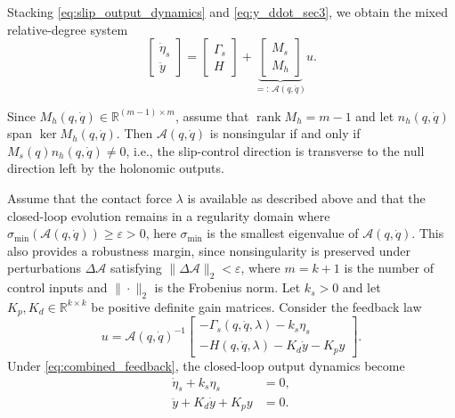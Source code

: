 \documentclass[letterpaper, 10 pt, conference]{ieeeconf}
\begin{document}
{Stacking \eqref{eq:slip_output_dynamics} and \eqref{eq:y_ddot_sec3}, we obtain the mixed relative-degree system
\begin{equation}
\begin{bmatrix}
\dot\eta_s\\[1mm]
\ddot y
\end{bmatrix}
=
\begin{bmatrix}
\Gamma_s\\[1mm]
H
\end{bmatrix}
+
\underbrace{\begin{bmatrix}
M_s\\[1mm]
M_h
\end{bmatrix}}_{=: \,\mathcal A(q,\dot q)}
u.
\label{eq:stacked_output_dynamics}
\end{equation}

Since $M_h(q,\dot q)\in\mathbb{R}^{(m-1)\times m}$, assume that $\operatorname{rank}M_h=m-1$ and let $n_h(q,\dot q)$ span $\ker M_h(q,\dot q)$. Then $\mathcal A(q,\dot q)$ is nonsingular if and only if $M_s(q)n_h(q,\dot q)\neq 0$, i.e., the slip-control direction is transverse to the null direction left by the holonomic outputs.

Assume that the contact force $\lambda$ is available as described above and that the closed-loop evolution remains in a regularity domain where $\sigma_{\min}(\mathcal A(q,\dot q))\geq\varepsilon>0$, here $\sigma_{\min}$ is the smallest eigenvalue of $\mathcal A(q,\dot q)$. This also provides a robustness margin, since nonsingularity is preserved under perturbations $\Delta\mathcal A$ satisfying $\|\Delta\mathcal A\|_2<\varepsilon$, where $m=k+1$ is the number of control inputs and $\|\cdot\|_{2}$ is the Frobenius norm. Let $k_s>0$ and let $K_p,K_d\in\mathbb{R}^{k\times k}$ be positive definite gain matrices. Consider the feedback law
\begin{equation}
u=
\mathcal A(q,\dot q)^{-1}
\begin{bmatrix}
-\Gamma_s(q,\dot q,\lambda)-k_s\eta_s\\[1mm]
-H(q,\dot q,\lambda)-K_d\dot y-K_p y
\end{bmatrix}.
\label{eq:combined_feedback}
\end{equation}
Under \eqref{eq:combined_feedback}, the closed-loop output dynamics become
\begin{align}
\dot\eta_s+k_s\eta_s&=0,
\label{eq:closed_loop_eta_s}
\\
\ddot y+K_d\dot y+K_p y&=0.
\label{eq:closed_loop_y}
\end{align}

}
\end{document}
